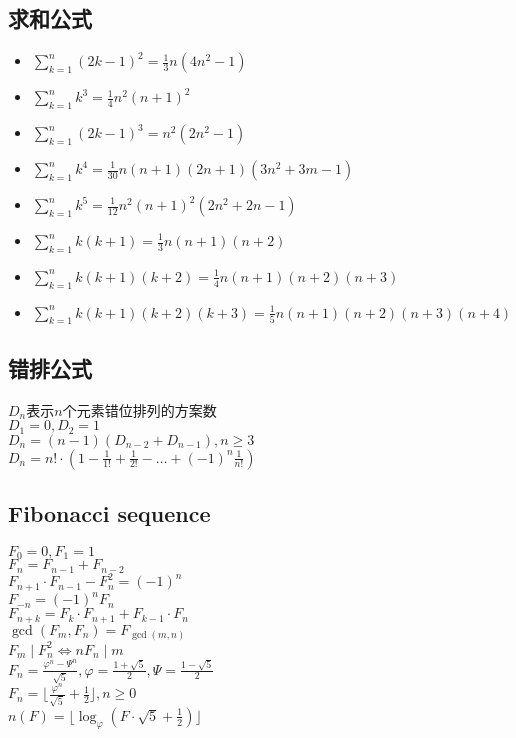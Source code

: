 	\subsection*{求和公式}
		\begin{itemize}
			\item $ \sum\limits_{k=1}^{n} (2k - 1)^2 = \frac{1}{3} n(4n^2 - 1) $
			\item $ \sum\limits_{k=1}^{n} k^3 = \frac{1}{4} n^2(n + 1)^2 $
			\item $ \sum\limits_{k=1}^{n} (2k - 1)^3 = n^2(2n^2 - 1) $
			\item $ \sum\limits_{k=1}^{n} k^4 = \frac{1}{30} n(n + 1) (2n + 1) (3n^2 + 3m - 1) $
			\item $ \sum\limits_{k=1}^{n} k^5 = \frac{1}{12} n^2(n + 1)^2(2n^2 + 2n - 1) $
			\item $ \sum\limits_{k=1}^{n} k(k + 1) = \frac{1}{3} n(n + 1)(n + 2) $
			\item $ \sum\limits_{k=1}^{n} k(k + 1)(k + 2) = \frac{1}{4} n(n + 1)(n + 2)(n + 3) $
			\item $ \sum\limits_{k=1}^{n} k(k + 1)(k + 2)(k + 3) = \frac{1}{5} n(n + 1)(n + 2)(n + 3)(n + 4) $
		\end{itemize}
	\subsection*{错排公式}
		$ D_n $表示$ n $个元素错位排列的方案数
		\\$ D_1 = 0, D_2 = 1 $
		\\$ D_n = (n - 1)(D_{n - 2} + D_{n - 1}), n \geq 3 $
		\\$ D_n = n! \cdot (1 - \frac{1}{1!} + \frac{1}{2!} - \dots + (-1)^n\frac{1}{n!}) $
	\subsection*{Fibonacci sequence}
		$ F_0 = 0, F_1 = 1 $
		\\$ F_n = F_{n - 1} + F_{n - 2} $
		\\$ F_{n + 1} \cdot F_{n - 1} - F_{n}^2 = (-1)^n $
		\\$ F_{-n} = (-1)^n F_n $
		\\$ F_{n + k} = F_k \cdot F_{n + 1} + F_{k - 1} \cdot F_n $
		\\$ \gcd(F_m, F_n) = F_{\gcd(m, n)} $
		\\$ F_m \mid F_n^2 \Leftrightarrow nF_n \mid m $
		\\$ F_n = \frac{\varphi^n - \varPsi^n}{\sqrt{5}}, \varphi = \frac{1 + \sqrt{5}}{2}, \varPsi = \frac{1 - \sqrt{5}}{2} $
		\\$ F_n = \lfloor \frac{\varphi^n}{\sqrt{5}} + \frac{1}{2} \rfloor, n \geq 0 $
		\\$ n(F) = \lfloor \log_\varphi(F \cdot \sqrt{5} + \frac{1}{2}) \rfloor $
